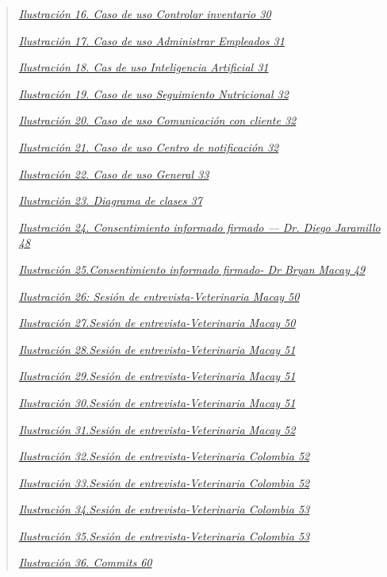 \documentclass[
]{article}
\begin{document}
\begin{quote}
\hyperref[_bookmark47]{\emph{Ilustración 16. Caso de uso Controlar
inventario 30}}

\hyperref[_bookmark48]{\emph{Ilustración 17. Caso de uso Administrar
Empleados 31}}

\hyperref[_bookmark49]{\emph{Ilustración 18. Cas de uso Inteligencia
Artificial 31}}

\hyperref[_bookmark50]{\emph{Ilustración 19. Caso de uso Seguimiento
Nutricional 32}}

\hyperref[_bookmark51]{\emph{Ilustración 20. Caso de uso Comunicación
con cliente 32}}

\hyperref[_bookmark52]{\emph{Ilustración 21. Caso de uso Centro de
notificación 32}}

\hyperref[_bookmark53]{\emph{Ilustración 22. Caso de uso General 33}}

\hyperref[_bookmark57]{\emph{Ilustración 23. Diagrama de clases 37}}

\hyperref[_bookmark87]{\emph{Ilustración 24. Consentimiento informado
firmado --- Dr. Diego Jaramillo 48}}

\hyperref[_bookmark88]{\emph{Ilustración 25.Consentimiento informado
firmado- Dr Bryan Macay 49}}

\hyperref[_bookmark90]{\emph{Ilustración 26: Sesión de
entrevista-Veterinaria Macay 50}}

\hyperref[_bookmark91]{\emph{Ilustración 27.Sesión de
entrevista-Veterinaria Macay 50}}

\hyperref[_bookmark92]{\emph{Ilustración 28.Sesión de
entrevista-Veterinaria Macay 51}}

\hyperref[_bookmark93]{\emph{Ilustración 29.Sesión de
entrevista-Veterinaria Macay 51}}

\hyperref[_bookmark94]{\emph{Ilustración 30.Sesión de
entrevista-Veterinaria Macay 51}}

\hyperref[_bookmark95]{\emph{Ilustración 31.Sesión de
entrevista-Veterinaria Macay 52}}

\hyperref[_bookmark96]{\emph{Ilustración 32.Sesión de
entrevista-Veterinaria Colombia 52}}

\hyperref[_bookmark97]{\emph{Ilustración 33.Sesión de
entrevista-Veterinaria Colombia 52}}

\hyperref[_bookmark98]{\emph{Ilustración 34.Sesión de
entrevista-Veterinaria Colombia 53}}

\hyperref[_bookmark99]{\emph{Ilustración 35.Sesión de
entrevista-Veterinaria Colombia 53}}

\hyperref[_bookmark115]{\emph{Ilustración 36. Commits 60}}
\end{quote}
\end{document}

